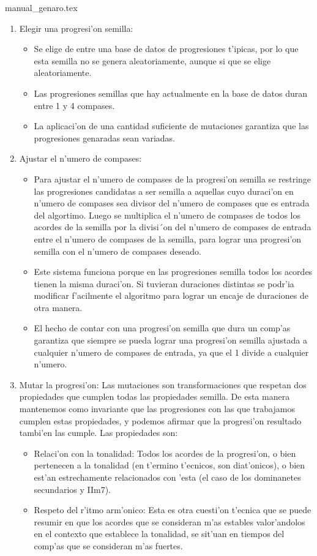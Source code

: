 ﻿manual_genaro.tex\documentclass[a4paper,12pt]{article}
\begin{document}
\begin{enumerate}
\item Elegir una progresi'on semilla: 
        \begin{itemize}
        \item Se elige de entre una base de datos de progresiones t'ipicas, por lo que esta semilla no se genera aleatoriamente, aunque si que se elige aleatoriamente.
        \item Las progresiones semillas que hay actualmente en la base de datos duran entre 1 y 4 compases.
        \item La aplicaci'on de una cantidad suficiente de mutaciones garantiza que las progresiones genaradas sean variadas.
        \end{itemize}       
\item Ajustar el n'umero de compases:
        \begin{itemize}
        \item Para ajustar el n'umero de compases de la progresi'on semilla se restringe las progresiones candidatas a ser semilla a aquellas cuyo duraci'on en n'umero de compases sea divisor del n'umero de compases que es entrada del algortimo. Luego se multiplica el n'umero de compases de todos los acordes de la semilla por la divisi´on del n'umero de compases de entrada entre el n'umero de compases de la semilla, para lograr una progresi'on semilla con el n'umero de compases deseado.
        \item Este sistema funciona porque en las progresiones semilla todos los acordes tienen la misma duraci'on. Si tuvieran duraciones distintas se podr'ia modificar f'acilmente el algoritmo para lograr un encaje de duraciones de otra manera.
        \item El hecho de contar con una progresi'on semilla que dura un comp'as garantiza que siempre se pueda lograr una progresi'on semilla ajustada a cualquier n'umero de compases de entrada, ya que el 1 divide a cualquier n'umero.
        \end{itemize}       
\item Mutar la progresi'on: Las mutaciones son transformaciones que respetan dos propiedades que cumplen todas las propiedades semilla. De esta manera mantenemos como invariante que las progresiones con las que trabajamos cumplen estas propiedades, y podemos afirmar que la progresi'on resultado tambi'en las cumple. Las propiedades son:

        \begin{itemize}
        \item Relaci'on con la tonalidad: Todos los acordes de la progresi'on, o bien pertenecen a la tonalidad (en t'ermino t'ecnicos, son diat'onicos), o bien est'an estrechamente relacionados con 'esta (el caso de los dominanetes secundarios y IIm7). 
        \item Respeto del r'itmo arm'onico: Esta es otra cuesti'on t'ecnica que se puede resumir en que los acordes que se consideran m'as estables valor'andolos en el contexto que establece la tonalidad, se sit'uan en tiempos del comp'as que se consideran m'as fuertes.
        \end{itemize}


\end{enumerate}
\end{document}
